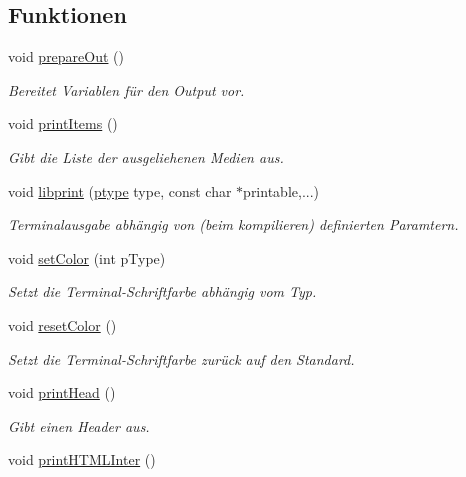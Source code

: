 \subsection*{Funktionen}
\begin{DoxyCompactItemize}
\item 
void \hyperlink{group___lend_lib_out_gae6bfc3bcebb80e387b4ad8a773496437}{prepare\+Out} ()
\begin{DoxyCompactList}\small\item\em Bereitet Variablen für den Output vor. \end{DoxyCompactList}\item 
void \hyperlink{group___lend_lib_out_ga83cb01db1bc577a2e4a54cbe62773c17}{print\+Items} ()
\begin{DoxyCompactList}\small\item\em Gibt die Liste der ausgeliehenen Medien aus. \end{DoxyCompactList}\item 
void \hyperlink{group___lend_lib_out_ga152ba05f7c1a27f69bd9c243359609c6}{libprint} (\hyperlink{group___lend_lib_out_ga0916607956575302a93dbd21440edc1a}{ptype} type, const char $\ast$printable,...)
\begin{DoxyCompactList}\small\item\em Terminalausgabe abhängig von (beim kompilieren) definierten Paramtern. \end{DoxyCompactList}\item 
void \hyperlink{group___lend_lib_out_ga1b5f37b5e6ac0f38b6933a16e0460579}{set\+Color} (int p\+Type)
\begin{DoxyCompactList}\small\item\em Setzt die Terminal-\/\+Schriftfarbe abhängig vom Typ. \end{DoxyCompactList}\item 
void \hyperlink{group___lend_lib_out_gafe00396766eb6b8ca4674de4c5d3d949}{reset\+Color} ()
\begin{DoxyCompactList}\small\item\em Setzt die Terminal-\/\+Schriftfarbe zurück auf den Standard. \end{DoxyCompactList}\item 
void \hyperlink{group___lend_lib_out_ga903241157072885e802dea85fc6a976c}{print\+Head} ()
\begin{DoxyCompactList}\small\item\em Gibt einen Header aus. \end{DoxyCompactList}\item 
void \hyperlink{group___lend_lib_out_ga6f008e199b4cc5c47c6d85367cc5bda2}{print\+H\+T\+M\+L\+Inter} ()\hypertarget{group___lend_lib_out_ga6f008e199b4cc5c47c6d85367cc5bda2}{}\label{group___lend_lib_out_ga6f008e199b4cc5c47c6d85367cc5bda2}


\end{DoxyCompactItemize}
